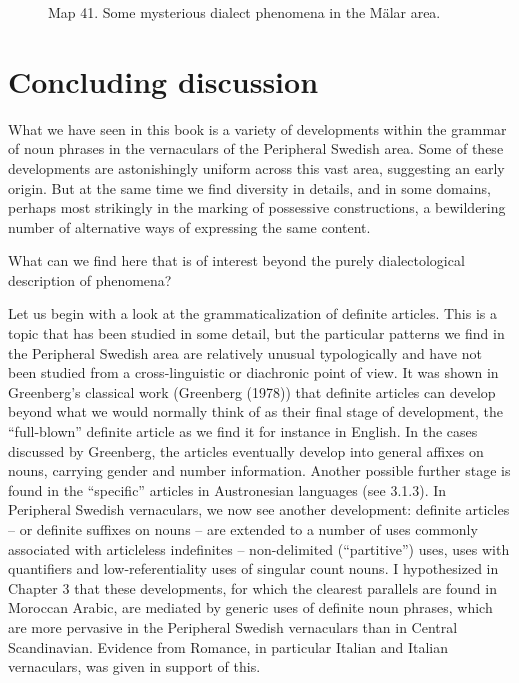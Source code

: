 
\begin{figure}[h]
\centering
\begin{minipage}{7.23611in}
\label{bkm:Ref133741503}Map 41. Some mysterious dialect phenomena in the Mälar area.
\end{minipage}
\end{figure}
\section[Concluding discussion]{\rmfamily Concluding discussion}
What we have seen in this book is a variety of developments within the grammar of noun phrases in the vernaculars of the Peripheral Swedish area. Some of these developments are astonishingly uniform across this vast area, suggesting an early origin. But at the same time we find diversity in details, and in some domains, perhaps most strikingly in the marking of possessive constructions, a bewildering number of alternative ways of expressing the same content. 

What can we find here that is of interest beyond the purely dialectological description of phenomena? 

Let us begin with a look at the grammaticalization of definite articles. This is a topic that has been studied in some detail, but the particular patterns we find in the Peripheral Swedish area are relatively unusual typologically and have not been studied from a cross-linguistic or diachronic point of view. It was shown in Greenberg’s classical work (Greenberg (1978)) that definite articles can develop beyond what we would normally think of as their final stage of development, the “full-blown” definite article as we find it for instance in English. In the cases discussed by Greenberg, the articles eventually develop into general affixes on nouns, carrying gender and number information. Another possible further stage is found in the “specific” articles in Austronesian languages (see 3.1.3). In Peripheral Swedish vernaculars, we now see another development: definite articles – or definite suffixes on nouns – are extended to a number of uses commonly associated with articleless indefinites – non-delimited (“partitive”) uses, uses with quantifiers and low-referentiality uses of singular count nouns. I hypothesized in Chapter 3 that these developments, for which the clearest parallels are found in Moroccan Arabic, are mediated by generic uses of definite noun phrases, which are more pervasive in the Peripheral Swedish vernaculars than in Central Scandinavian. Evidence from Romance, in particular Italian and Italian vernaculars, was given in support of this. 

